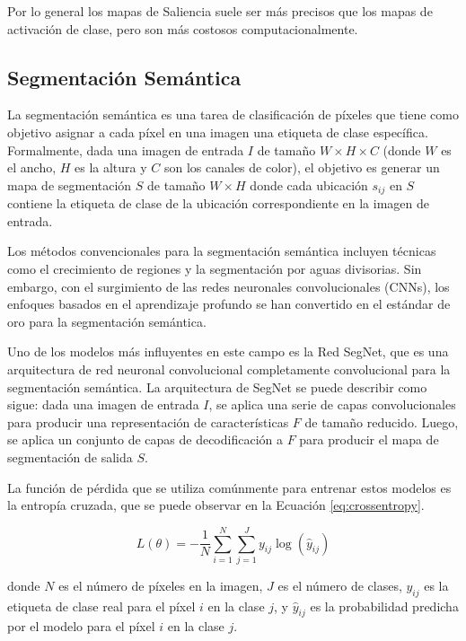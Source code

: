 \documentclass[10pt,a4paper,twocolumn,twoside]{article}
\begin{document}
Por lo general los mapas de Saliencia suele ser más precisos que los mapas de activación de clase, pero son más costosos computacionalmente.

\subsection{Segmentación Semántica}

La segmentación semántica es una tarea de clasificación de píxeles que tiene como objetivo asignar a cada píxel en una imagen una etiqueta de clase específica. Formalmente, dada una imagen de entrada $I$ de tamaño $W \times H \times C$ (donde $W$ es el ancho, $H$ es la altura y $C$ son los canales de color), el objetivo es generar un mapa de segmentación $S$ de tamaño $W \times H$ donde cada ubicación $s_{ij}$ en $S$ contiene la etiqueta de clase de la ubicación correspondiente en la imagen de entrada.

Los métodos convencionales para la segmentación semántica incluyen técnicas como el crecimiento de regiones y la segmentación por aguas divisorias. Sin embargo, con el surgimiento de las redes neuronales convolucionales (CNNs), los enfoques basados en el aprendizaje profundo se han convertido en el estándar de oro para la segmentación semántica.

Uno de los modelos más influyentes en este campo es la Red SegNet, que es una arquitectura de red neuronal convolucional completamente convolucional para la segmentación semántica. La arquitectura de SegNet se puede describir como sigue: dada una imagen de entrada $I$, se aplica una serie de capas convolucionales para producir una representación de características $F$ de tamaño reducido. Luego, se aplica un conjunto de capas de decodificación a $F$ para producir el mapa de segmentación de salida $S$.

La función de pérdida que se utiliza comúnmente para entrenar estos modelos es la entropía cruzada, que se puede observar en la Ecuación \ref{eq:crossentropy}.

\begin{equation}
L(\theta) = -\frac{1}{N}\sum_{i=1}^{N}\sum_{j=1}^{J} y_{ij} \log(\hat{y}_{ij})
\label{eq:crossentropy}
\end{equation}

donde $N$ es el número de píxeles en la imagen, $J$ es el número de clases, $y_{ij}$ es la etiqueta de clase real para el píxel $i$ en la clase $j$, y $\hat{y}_{ij}$ es la probabilidad predicha por el modelo para el píxel $i$ en la clase $j$.
\end{document}
